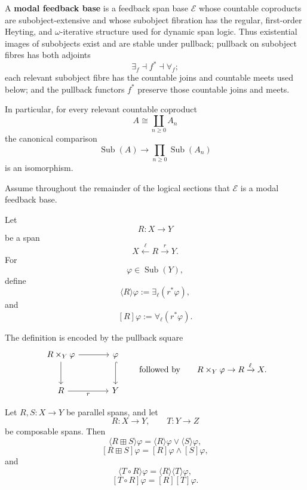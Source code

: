 \begin{definition}
\label{def:modal-feedback-base}
A \textbf{modal feedback base} is a feedback span base \(\mathcal E\) whose
countable coproducts are subobject-extensive and whose subobject fibration has
the regular, first-order Heyting, and \(\omega\)-iterative structure used for
dynamic span logic. Thus existential images of subobjects exist and are stable
under pullback; pullback on subobject fibres has both adjoints
\[
  \exists_f\dashv f^\ast\dashv\forall_f;
\]
each relevant subobject fibre has the countable joins and countable meets used
below; and the pullback functors \(f^\ast\) preserve those countable joins and
meets.

In particular, for every relevant countable coproduct
\[
  A\cong\coprod_{n\geq 0}A_n
\]
the canonical comparison
\[
  \operatorname{Sub}(A)
  \longrightarrow
  \prod_{n\geq 0}\operatorname{Sub}(A_n)
\]
is an isomorphism.
\end{definition}

Assume throughout the remainder of the logical sections that \(\mathcal E\) is
a modal feedback base.

Let
\[
  R:X\to Y
\]
be a span
\[
  X\xleftarrow{\ell}R\xrightarrow{r}Y.
\]
For
\[
  \varphi\in\operatorname{Sub}(Y),
\]
define
\[
  \langle R\rangle\varphi
  :=
  \exists_{\ell}(r^\ast\varphi),
\]
and
\[
  [R]\varphi
  :=
  \forall_{\ell}(r^\ast\varphi).
\]

The definition is encoded by the pullback square
\[
\begin{tikzcd}[column sep=large,row sep=large]
  R\times_Y \varphi
    \ar[r]
    \ar[d]
  &
  \varphi
    \ar[d,hook]
  \\
  R
    \ar[r,"r"']
  &
  Y
\end{tikzcd}
\qquad
\text{followed by}
\qquad
R\times_Y\varphi\to R\xrightarrow{\ell}X .
\]

\begin{lemma}
\label{lem:modal-calculus-feedback}
Let \(R,S:X\to Y\) be parallel spans, and let
\[
  R:X\to Y,
  \qquad
  T:Y\to Z
\]
be composable spans. Then
\[
  \langle R\boxplus S\rangle\varphi
  =
  \langle R\rangle\varphi
  \vee
  \langle S\rangle\varphi,
\]
\[
  [R\boxplus S]\varphi
  =
  [R]\varphi
  \wedge
  [S]\varphi,
\]
and
\[
  \langle T\circ R\rangle\varphi
  =
  \langle R\rangle\langle T\rangle\varphi,
\]
\[
  [T\circ R]\varphi
  =
  [R][T]\varphi.
\]
\end{lemma}

